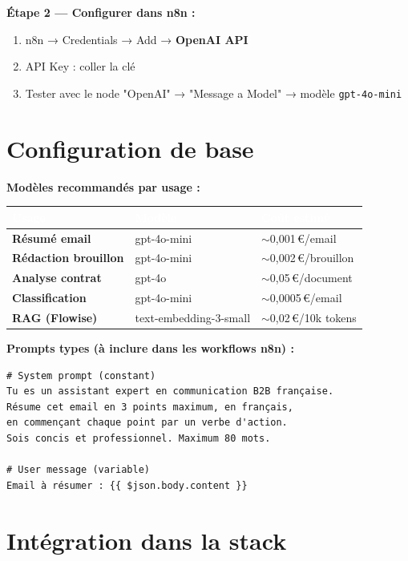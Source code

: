\documentclass[11pt, a4paper]{article}
\begin{document}
\textbf{Étape 2 — Configurer dans n8n :}
\begin{enumerate}
  \item n8n → Credentials → Add → \textbf{OpenAI API}
  \item API Key : coller la clé
  \item Tester avec le node "OpenAI" → "Message a Model" → modèle \texttt{gpt-4o-mini}
\end{enumerate}

\section{Configuration de base}

\textbf{Modèles recommandés par usage :}

\begin{center}
\renewcommand{\arraystretch}{1.4}
\begin{tabularx}{\linewidth}{>{\bfseries}p{3.2cm} p{2.8cm} X}
\toprule
\rowcolor{tabheader}
\textcolor{white}{\textbf{Usage}} & \textcolor{white}{\textbf{Modèle}} & \textcolor{white}{\textbf{Coût estimé}} \\
\midrule
Résumé email & gpt-4o-mini & $\sim$0,001\,€/email \\
\rowcolor{rowgray}
Rédaction brouillon & gpt-4o-mini & $\sim$0,002\,€/brouillon \\
Analyse contrat & gpt-4o & $\sim$0,05\,€/document \\
\rowcolor{rowgray}
Classification & gpt-4o-mini & $\sim$0,0005\,€/email \\
RAG (Flowise) & text-embedding-3-small & $\sim$0,02\,€/10k tokens \\
\bottomrule
\end{tabularx}
\end{center}

\textbf{Prompts types (à inclure dans les workflows n8n) :}

\begin{lstlisting}[style=yamlstyle, caption={Prompt système pour résumé email}]
# System prompt (constant)
Tu es un assistant expert en communication B2B française.
Résume cet email en 3 points maximum, en français,
en commençant chaque point par un verbe d'action.
Sois concis et professionnel. Maximum 80 mots.

# User message (variable)
Email à résumer : {{ $json.body.content }}
\end{lstlisting}

\section{Intégration dans la stack}
\end{document}

